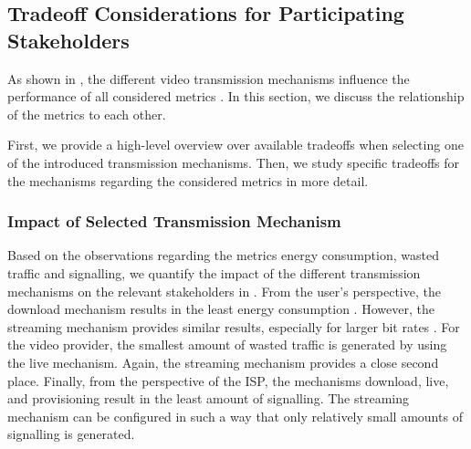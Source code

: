\subsection{Tradeoff Considerations for Participating Stakeholders}\label{sec:application:lte_video:trade_offs}
As shown in , the different video transmission mechanisms influence the performance of all considered metrics . 
In this section, we discuss the relationship of the metrics to each other.

First, we provide a high-level overview over available tradeoffs when selecting one of the introduced transmission mechanisms.
Then, we study specific tradeoffs for the \streaming mechanisms regarding the considered metrics in more detail.

\subsubsection*{Impact of Selected Transmission Mechanism}\label{sec:application:lte_video:trade_offs:mechanism_selection}

Based on the observations regarding the metrics energy consumption, wasted traffic and signalling, we quantify the impact of the different transmission mechanisms on the relevant stakeholders in .
From the user's perspective, the download mechanism results in the least energy consumption \energyconsumption.
However, the streaming mechanism provides similar results, especially for larger bit rates \bitrate.
For the video provider, the smallest amount of wasted traffic is generated by using the live mechanism.
Again, the streaming mechanism provides a close second place.
Finally, from the perspective of the \gls{ISP}, the mechanisms download, live, and provisioning result in the least amount of signalling.
The streaming mechanism can be configured in such a way that only relatively small amounts of signalling is generated.


